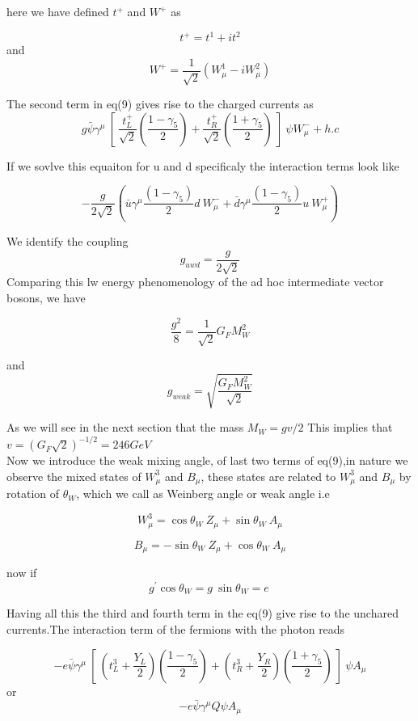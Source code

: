 \documentclass[12pt]{article}
\newcommand{\be}{\begin{equation}}
\newcommand{\ee}{\end{equation}}
\begin{document}
here we have defined $t^{+}$ and $W^{+}$ as 

\be t^{+} = t^{1} + i t^{2} \ee
and 
\be W^{+} =\frac{1}{\sqrt{2}}\left( W_{\mu}^{1} - i W_{\mu}^{2}\right) \ee


The second term in eq(9) gives rise to the charged currents as
\be g  \bar{\psi} \gamma^{\mu} ~\left [~ \frac{ t_{L}^{+} } {\sqrt{2} }\left (\frac {1- \gamma_{5} } {2} \right) + \frac{ t_{R}^{+} } {\sqrt{2} }\left (\frac {1+ \gamma_{5} } {2}\right ) ~\right]~\psi W_{\mu}^{-} +h.c\ee

If we sovlve this equaiton for u and d specificaly the interaction terms look like

\be -\frac{g}{2\sqrt{2}} \left(\bar u \gamma^{\mu} \frac{\left(1-\gamma_{5}\right)}{2} d~ W_{\mu}^{-} + \bar d \gamma^{\mu}\frac{\left(1-\gamma_{5}\right)}{2} u ~W_{\mu}^{+} \right) \ee

We identify the coupling 
$$g_{uwd}=\frac{g}{2 \sqrt{2}}$$
Comparing this lw energy phenomenology of the ad hoc intermediate vector bosons, we have

\be \frac{g^2}{8}=\frac{1}{\sqrt{2}}G_{F} M_{W}^{2}\ee

and 
$$g_{weak}=\sqrt{\frac{G_{F}M_{W}^{2}}{\sqrt{2}}} $$



As we will see in the next section that the mass $M_{W}=gv/2$
This implies that $v=\left(G_{F} \sqrt{2}\right)^{-1/2}= 246GeV$\\


Now we introduce the weak mixing angle, of last two terms of eq(9),in nature we observe the mixed states of $W_{\mu}^{3}$ and $B_{\mu}$, these states are related to $W_{\mu}^{3}$ and $B_{\mu}$ by rotation of $\theta_{W}$, which we call as Weinberg angle or weak angle i.e

\be W_{\mu}^{3} =  \cos{ \theta_{W}} ~ Z_{\mu} +\sin{ \theta_{W}} ~A_{\mu}\ee


\be B_{\mu} = -\sin{ \theta_{W} }~ Z_{\mu} + \cos{ \theta_{W}}~ A_{\mu}  \ee

now if $$ g^{'} \cos{\theta_{W}} =g~ \sin{\theta_{W}} =e~ $$



 
Having all this the third and fourth term in the eq(9) give rise to the unchared currents.The interaction term of the fermions with the photon reads

\be- e \bar{\psi} \gamma^{\mu}~\left [~ \left(t_{L}^{3} +\frac{Y_{L}}{2} \right) \left(\frac {1- \gamma_{5} } {2}\right ) +\left  (t_{R}^{3} +\frac{Y_{R}}{2}\right ) \left(\frac {1+\gamma_{5} } {2}\right )~ \right]~ \psi A_{\mu}\ee
or
\be -e \bar{\psi} \gamma^{\mu} Q \psi A_{\mu}\ee
\end{document}
